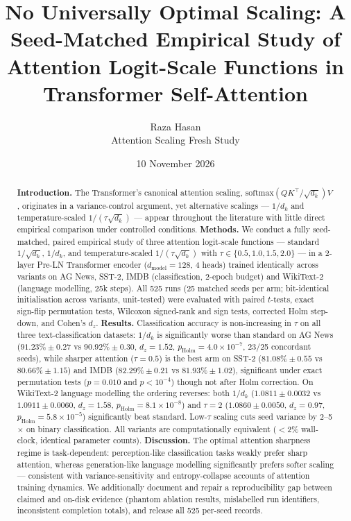 \documentclass[11pt,a4paper]{article}
\title{\textbf{No Universally Optimal Scaling: A Seed-Matched Empirical Study of\\ Attention Logit-Scale Functions in Transformer Self-Attention}}
\author{Raza Hasan\\ \small Attention Scaling Fresh Study}
\date{10 November 2026}
\begin{document}
\maketitle

\begin{abstract}
\noindent\textbf{Introduction.} The Transformer's canonical attention scaling, $\mathrm{softmax}(QK^{\top}/\sqrt{d_k})V$, originates in a variance-control argument, yet alternative scalings --- $1/d_k$ and temperature-scaled $1/(\tau\sqrt{d_k})$ --- appear throughout the literature with little direct empirical comparison under controlled conditions.
\textbf{Methods.} We conduct a fully seed-matched, paired empirical study of three attention logit-scale functions --- standard $1/\sqrt{d_k}$, $1/d_k$, and temperature-scaled $1/(\tau\sqrt{d_k})$ with $\tau \in \{0.5, 1.0, 1.5, 2.0\}$ --- in a 2-layer Pre-LN Transformer encoder ($d_{\text{model}}{=}128$, 4 heads) trained identically across variants on AG News, SST-2, IMDB (classification, 2-epoch budget) and WikiText-2 (language modelling, 25k steps). All 525 runs (25 matched seeds per arm; bit-identical initialisation across variants, unit-tested) were evaluated with paired $t$-tests, exact sign-flip permutation tests, Wilcoxon signed-rank and sign tests, corrected Holm step-down, and Cohen's $d_z$.
\textbf{Results.} Classification accuracy is non-increasing in $\tau$ on all three text-classification datasets: $1/d_k$ is significantly worse than standard on AG News ($91.23\%\pm0.27$ vs $90.92\%\pm0.30$, $d_z{=}1.52$, $p_{\mathrm{Holm}}{=}4.0\times10^{-7}$, 23/25 concordant seeds), while sharper attention ($\tau{=}0.5$) is the best arm on SST-2 ($81.08\%\pm0.55$ vs $80.66\%\pm1.15$) and IMDB ($82.29\%\pm0.21$ vs $81.93\%\pm1.02$), significant under exact permutation tests ($p{=}0.010$ and $p{<}10^{-4}$) though not after Holm correction. On WikiText-2 language modelling the ordering reverses: both $1/d_k$ ($1.0811\pm0.0032$ vs $1.0911\pm0.0060$, $d_z{=}1.58$, $p_{\mathrm{Holm}}{=}8.1\times10^{-8}$) and $\tau{=}2$ ($1.0860\pm0.0050$, $d_z{=}0.97$, $p_{\mathrm{Holm}}{=}5.8\times10^{-5}$) significantly beat standard. Low-$\tau$ scaling cuts seed variance by 2--5$\times$ on binary classification. All variants are computationally equivalent ($<$2\% wall-clock, identical parameter counts).
\textbf{Discussion.} The optimal attention sharpness regime is task-dependent: perception-like classification tasks weakly prefer sharp attention, whereas generation-like language modelling significantly prefers softer scaling --- consistent with variance-sensitivity and entropy-collapse accounts of attention training dynamics. We additionally document and repair a reproducibility gap between claimed and on-disk evidence (phantom ablation results, mislabelled run identifiers, inconsistent completion totals), and release all 525 per-seed records.
\end{abstract}
\end{document}
